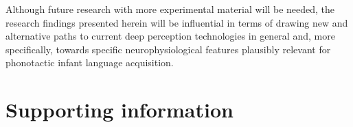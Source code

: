 \documentclass[10pt,letterpaper]{article}
\begin{document}
Although future research with more experimental material will be needed, the research findings presented herein will be influential in terms of drawing new and alternative paths to current deep perception technologies in general and, more specifically, towards specific neurophysiological features plausibly relevant for phonotactic infant language acquisition.


\section*{Supporting information}





\end{document}
